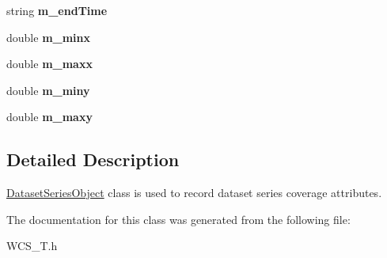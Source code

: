 \begin{DoxyCompactItemize}
\item 
\hypertarget{classDatasetSeriesObject_a6476c1f1941dbfa92d8ca576ce133c1c}{
string {\bfseries m\_\-endTime}}
\label{classDatasetSeriesObject_a6476c1f1941dbfa92d8ca576ce133c1c}

\item 
\hypertarget{classDatasetSeriesObject_a597a63ddf83d6167fe0c9519d863f31f}{
double {\bfseries m\_\-minx}}
\label{classDatasetSeriesObject_a597a63ddf83d6167fe0c9519d863f31f}

\item 
\hypertarget{classDatasetSeriesObject_a00ac953757188e066ac18d163241cf85}{
double {\bfseries m\_\-maxx}}
\label{classDatasetSeriesObject_a00ac953757188e066ac18d163241cf85}

\item 
\hypertarget{classDatasetSeriesObject_a53f54e21e6edcf0fdc8b025942f66bce}{
double {\bfseries m\_\-miny}}
\label{classDatasetSeriesObject_a53f54e21e6edcf0fdc8b025942f66bce}

\item 
\hypertarget{classDatasetSeriesObject_aee041e09e675971ded70b0a3544efa4f}{
double {\bfseries m\_\-maxy}}
\label{classDatasetSeriesObject_aee041e09e675971ded70b0a3544efa4f}

\end{DoxyCompactItemize}


\subsection{Detailed Description}
\hyperlink{classDatasetSeriesObject}{DatasetSeriesObject} class is used to record dataset series coverage attributes. 

The documentation for this class was generated from the following file:\begin{DoxyCompactItemize}
\item 
WCS\_\-T.h\end{DoxyCompactItemize}
